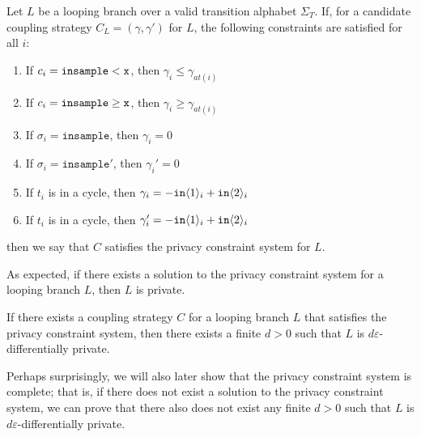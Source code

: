 \begin{defn}\label{privacyConstraintSystem}
    Let $L$ be a looping branch over a valid transition alphabet $\Sigma_T$. If, for a candidate coupling strategy $C_L = (\gamma, \gamma')$ for $L$, the following constraints are satisfied for all $i$: \begin{enumerate}
        \item If $c_i = \lguard[\texttt{x}]$, then $\gamma_i\leq\gamma_{at(i)}$
        \item If $c_i = \gguard[\texttt{x}]$, then $\gamma_i\geq\gamma_{at(i)}$
        \item If $\sigma_i = \texttt{insample}$, then $\gamma_i=0$
        \item If $\sigma_i = \texttt{insample}'$, then $\gamma_i'=0$
        \item If $t_i$ is in a cycle, then $\gamma_i = -\texttt{in}\brangle{1}_i+\texttt{in}\brangle{2}_i$
        \item If $t_i$ is in a cycle, then $\gamma_i' = -\texttt{in}\brangle{1}_i+\texttt{in}\brangle{2}_i$
    \end{enumerate}
    then we say that $C$ satisfies the privacy constraint system for $L$. 
\end{defn}

As expected, if there exists a solution to the privacy constraint system for a looping branch $L$, then $L$ is private.

\begin{prop}\label{privacyFiniteCostProp}
    If there exists a coupling strategy $C$ for a looping branch $L$ that satisfies the privacy constraint system, then there exists a finite $d>0$ such that $L$ is $d\varepsilon$-differentially private. 
\end{prop}

Perhaps surprisingly, we will also later show that the privacy constraint system is complete; that is, if there does not exist a solution to the privacy constraint system, we can prove that there also does not exist any finite $d>0$ such that $L$ is $d\varepsilon$-differentially private. 